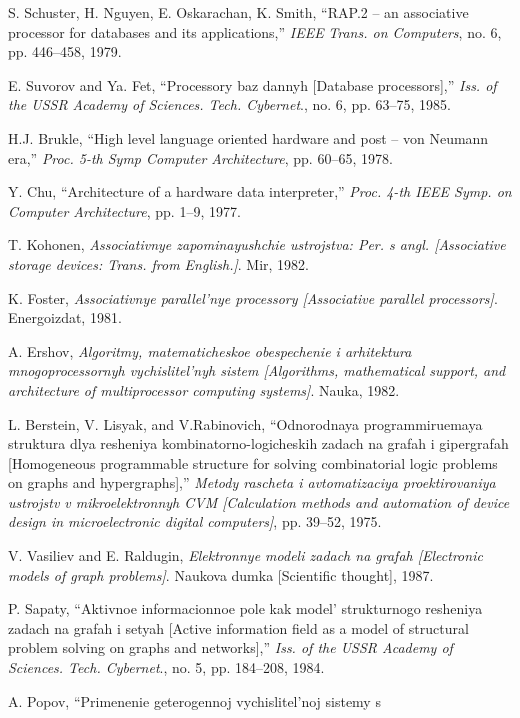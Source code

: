 \documentclass{article}
\begin{document}
{\begin{multicols}{2}
{\begin{thebibliography}{65}
    \item S. Schuster, H. Nguyen, E. Oskarachan, K. Smith, “RAP.2 – an
associative processor for databases and its applications,” \textsl{IEEE}
\textit{Trans. on Computers}, no. 6, pp. 446–458, 1979.

    \item E. Suvorov and Ya. Fet, “Processory baz dannyh [Database processors],” \textit{Iss. of the USSR Academy of Sciences. Tech. Cybernet}.,
no. 6, pp. 63–75, 1985.
    \item  H.J. Brukle, “High level language oriented hardware and post –
von Neumann era,” \textit{Proc. 5-th Symp Computer Architecture}, pp.
60–65, 1978.
    \item Y. Chu, “Architecture of a hardware data interpreter,” \textit{Proc. 4-th
IEEE Symp. on Computer Architecture}, pp. 1–9, 1977.
    \item T. Kohonen, \textit{Associativnye zapominayushchie ustrojstva: Per. s
angl. [Associative storage devices: Trans. from English.]}. Mir,
1982.
    \item K. Foster, \textit{Associativnye parallel’nye processory [Associative
parallel processors]}. Energoizdat, 1981.
    \item A. Ershov, \textit{Algoritmy, matematicheskoe obespechenie i arhitektura
mnogoprocessornyh vychislitel’nyh sistem [Algorithms, mathematical support, and architecture of multiprocessor computing
systems]}. Nauka, 1982.
    \item L. Berstein, V. Lisyak, and V.Rabinovich, “Odnorodnaya programmiruemaya struktura dlya resheniya kombinatorno-logicheskih
zadach na grafah i gipergrafah [Homogeneous programmable
structure for solving combinatorial logic problems on graphs and
hypergraphs],” \textit{Metody rascheta i avtomatizaciya proektirovaniya
ustrojstv v mikroelektronnyh CVM [Calculation methods and
automation of device design in microelectronic digital computers]},
pp. 39–52, 1975.
    \item V. Vasiliev and E. Raldugin, \textit{Elektronnye modeli zadach na
grafah [Electronic models of graph problems]}. Naukova dumka
[Scientific thought], 1987.
    \item P. Sapaty, “Aktivnoe informacionnoe pole kak model’ strukturnogo
resheniya zadach na grafah i setyah [Active information field as
a model of structural problem solving on graphs and networks],”
\textit{Iss. of the USSR Academy of Sciences. Tech. Cybernet}., no. 5, pp.
184–208, 1984.
    \item A. Popov, “Primenenie geterogennoj vychislitel’noj sistemy s

\end{thebibliography}}
\end{multicols}}
\end{document}
